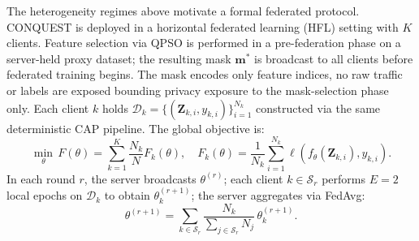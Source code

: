 \documentclass[conference]{IEEEtran}
\begin{document}
The heterogeneity regimes above motivate a formal federated
protocol. CONQUEST is deployed in a horizontal federated
learning (HFL) setting with $K$ clients. Feature selection
via QPSO is performed in a pre-federation phase on a
server-held proxy dataset; the resulting mask $\mathbf{m}^{*}$
is broadcast to all clients before federated training begins.
The mask encodes only feature indices, no raw traffic or
labels are exposed bounding privacy exposure to the
mask-selection phase only. Each client $k$ holds
$\mathcal{D}_k=\{(\mathbf{Z}_{k,i},y_{k,i})\}_{i=1}^{N_k}$
constructed via the same deterministic CAP pipeline. The
global objective is:
\begin{equation}
\min_{\theta}\,F(\theta)=\sum_{k=1}^{K}\frac{N_k}{N}F_k(\theta),
\quad F_k(\theta)=\frac{1}{N_k}\sum_{i=1}^{N_k}
\ell\!\left(f_\theta(\mathbf{Z}_{k,i}),y_{k,i}\right).
\label{eq:hfl_objective}
\end{equation}
In each round $r$, the server broadcasts $\theta^{(r)}$;
each client $k\in\mathcal{S}_r$ performs $E=2$ local epochs
on $\mathcal{D}_k$ to obtain $\theta_k^{(r+1)}$; the server
aggregates via FedAvg:
\begin{equation}
\theta^{(r+1)}=\sum_{k\in\mathcal{S}_r}
\frac{N_k}{\sum_{j\in\mathcal{S}_r}N_j}
\,\theta_k^{(r+1)}.
\label{eq:fedavg}
\end{equation}
\end{document}
